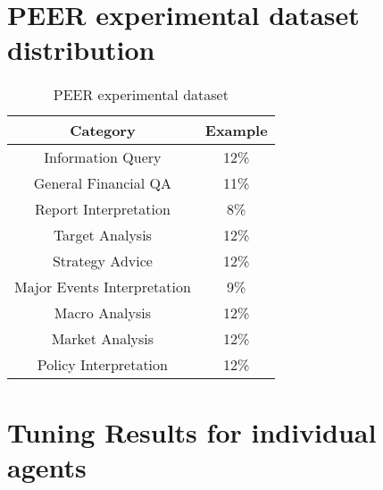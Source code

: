 \documentclass[11pt]{article}
\begin{document}
\section{PEER experimental dataset distribution}
\begin{table}[!h]
    \caption{PEER experimental dataset}
    \footnotesize
    \centering
    \renewcommand{\arraystretch}{1.5}
    \begin{tabular}{c|c}
    \hline
         Category & Example\\
    \hline
         Information Query & 12\%\\
         General Financial QA & 11\%\\
         Report Interpretation & 8\%\\
         Target Analysis & 12\%\\
         Strategy Advice & 12\%\\
         Major Events Interpretation & 9\%\\
         Macro Analysis & 12\%\\
         Market Analysis & 12\%\\
         Policy Interpretation & 12\%\\
    \hline
    \end{tabular}
    \label{tab:peerdatadis}
    \footnotesize
\end{table}
\section{Tuning Results for individual agents}
\end{document}
